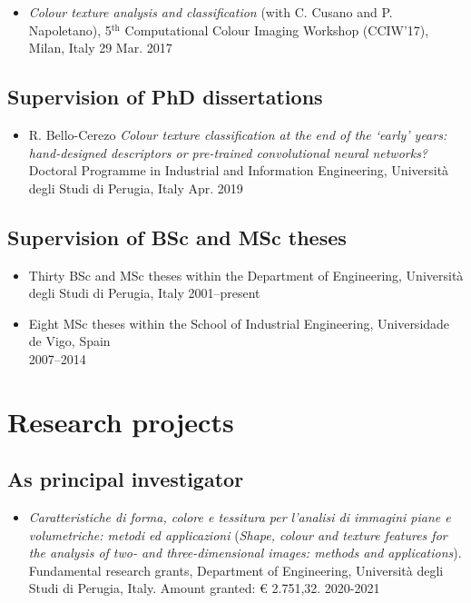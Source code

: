 \documentclass[11pt]{article}
\begin{document}
\begin{itemize}
	\item \emph{Colour texture analysis and classification} (with C. Cusano and P. Napoletano), 5$^\text{th}$ Computational Colour Imaging Workshop (CCIW’17), Milan, Italy \hfill 29 Mar. 2017
\end{itemize}

\subsection*{Supervision of PhD dissertations}

\begin{itemize}
	\item R. Bello-Cerezo \emph{Colour texture classification at the end of the `early' years: hand-designed descriptors or pre-trained convolutional neural networks?} Doctoral Programme in Industrial and Information Engineering, Università degli Studi di Perugia, Italy \hfill Apr. 2019
\end{itemize}

\subsection*{Supervision of BSc and MSc theses}

\begin{itemize}
	\item Thirty BSc and MSc theses within the Department of Engineering, Università degli Studi di Perugia, Italy \hfill 2001--present
	\item Eight MSc theses within the School of Industrial Engineering, Universidade de Vigo, Spain \\ \mbox{} \hfill 2007--2014
\end{itemize}

\section*{Research projects}

\subsection*{As principal investigator}

\begin{itemize}
	\item \emph{Caratteristiche di forma, colore e tessitura per l’analisi di immagini piane e volumetriche: metodi ed applicazioni} (\emph{Shape, colour and texture features for the analysis of two- and three-dimensional images: methods and applications}). Fundamental research grants, Department of Engineering, Università degli Studi di Perugia, Italy. Amount granted: € 2.751,32. \hfill 2020-2021
\end{itemize}
\end{document}

